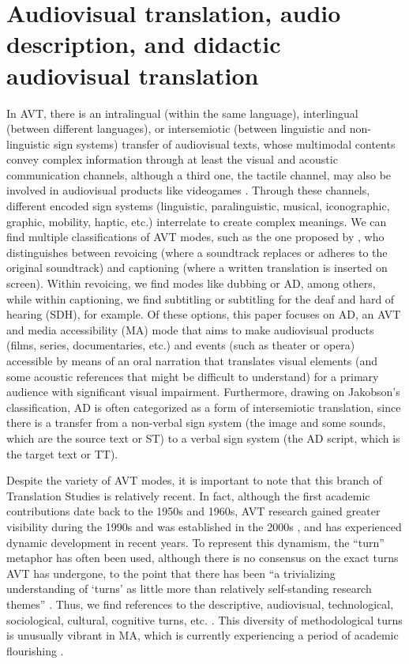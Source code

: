 \documentclass[english]{textolivre}
\begin{document}
\section{Audiovisual translation, audio description, and didactic audiovisual translation}\label{sec-normas}
In AVT, there is an intralingual (within the same language), interlingual (between different languages), or intersemiotic (between linguistic and non-linguistic sign systems) transfer of audiovisual texts, whose multimodal contents convey complex information through at least the visual and acoustic communication channels, although a third one, the tactile channel, may also be involved in audiovisual products like videogames \cite{mejias-climent2021}. Through these channels, different encoded sign systems (linguistic, paralinguistic, musical, iconographic, graphic, mobility, haptic, etc.) interrelate to create complex meanings. We can find multiple classifications of AVT modes, such as the one proposed by \textcite{chaume2004,chaume2012}, who distinguishes between revoicing (where a soundtrack replaces or adheres to the original soundtrack) and captioning (where a written translation is inserted on screen). Within revoicing, we find modes like dubbing or AD, among others, while within captioning, we find subtitling or subtitling for the deaf and hard of hearing (SDH), for example. Of these options, this paper focuses on AD, an AVT and media accessibility (MA) mode that aims to make audiovisual products (films, series, documentaries, etc.) and events (such as theater or opera) accessible by means of an oral narration that translates visual elements (and some acoustic references that might be difficult to understand) for a primary audience with significant visual impairment. Furthermore, drawing on Jakobson’s \citeyear{jakobson1959} classification, AD is often categorized as a form of intersemiotic translation, since there is a transfer from a non-verbal sign system (the image and some sounds, which are the source text or ST) to a verbal sign system (the AD script, which is the target text or TT). 

Despite the variety of AVT modes, it is important to note that this branch of Translation Studies is relatively recent. In fact, although the first academic contributions date back to the 1950s and 1960s, AVT research gained greater visibility during the 1990s and was established in the 2000s \cite{mangiron2022}, and has experienced dynamic development in recent years. To represent this dynamism, the “turn” metaphor has often been used, although there is no consensus on the exact turns AVT has undergone, to the point that there has been “a trivializing understanding of ‘turns’ as little more than relatively self-standing research themes” \cite[p. 1]{perez-gonzalez2019}. Thus, we find references to the descriptive, audiovisual, technological, sociological, cultural, cognitive turns, etc. \cite{remael2010,ohagan2013,chaume2018,perez-gonzalez2019}. This diversity of methodological turns is unusually vibrant in MA, which is currently experiencing a period of academic flourishing \cite{neves2022}. 
\end{document}
